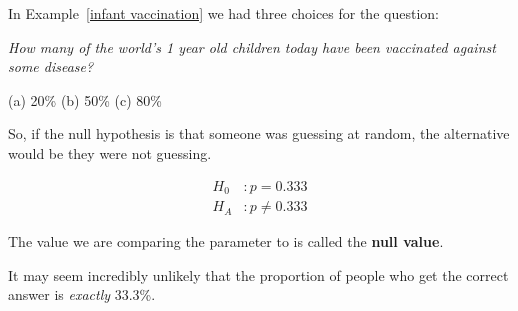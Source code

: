 \documentclass{beamer}
\begin{document}
\begin{frame}
  \begin{example}
    In Example~\ref{infant vaccination} we had three choices for the question:
    
    \vspace{1mm}
    \emph{How many of the world's 1 year old children today have been vaccinated against some disease?}

    \vspace{-2.5mm}
    \begin{center}
      (a) 20\%
      \qquad\quad
      (b) 50\%
      \qquad\quad
      (c) 80\%
    \end{center}\pause

    \vspace{-2mm}
    \pause
    \pause

    \vspace{1mm}
    So, if the null hypothesis is that someone was guessing at random, the alternative would be they were not guessing.\pause

    \vspace{-3mm}
    \begin{equation*}
      \begin{aligned}
        H_0 &: p = 0.333 \\
        H_A &: p \neq 0.333
      \end{aligned}
    \end{equation*}
  \end{example}\pause

  \begin{definition}
    The value we are comparing the parameter to is called the \textbf{null value}.
  \end{definition}
\end{frame}

\begin{frame}
  \begin{examplecont}
    It may seem incredibly unlikely that the proportion of people who get the correct answer is \emph{exactly} 33.3\%.

    \vspace{1mm}
    \pause
  \end{examplecont}
\end{frame}
\end{document}
